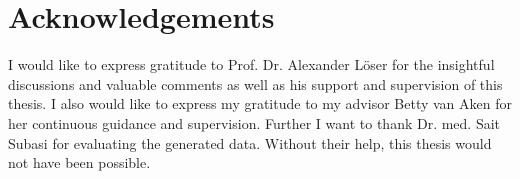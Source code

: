 \documentclass[11pt, a4paper, oneside]{book}
\begin{document}
\clearpage\newpage
{}
%



\newpage

\section*{Acknowledgements}
I would like to express gratitude to Prof. Dr. Alexander Löser for the insightful discussions and valuable comments as well as his support and supervision of this thesis. I also would like to express my gratitude to my advisor Betty van Aken for her continuous guidance and supervision. Further I want to thank Dr. med. Sait Subasi for evaluating the generated data. Without their help, this thesis would not have been possible.
\end{document}

